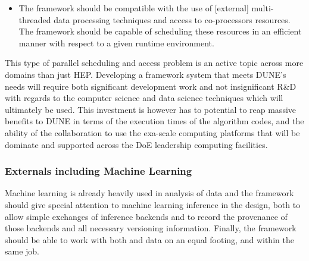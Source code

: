 \documentclass[../main-v1.tex]{subfiles}
\begin{document}
\begin{itemize}
\item The framework should be compatible with the use of [external] multi-threaded data processing techniques and access to co-processors resources.  The framework should be capable of scheduling these resources in an efficient manner with respect to a given runtime environment. 
\end{itemize}

This type of parallel scheduling and access problem is an active topic across more domains than just HEP.  Developing a framework system that meets DUNE's needs will require both significant development work and not insignificant R\&D with regards to the computer science and data science techniques which will ultimately be used.  This investment is however has to potential to reap massive benefits to DUNE in terms of the execution times of the algorithm codes, and the ability of the collaboration to use the exa-scale computing platforms that will be dominate and supported across the DoE leadership computing facilities.




\subsubsection{Externals including Machine Learning}
Machine learning is already heavily used in analysis of  data and the framework should give special attention to machine learning inference in the design, both to allow simple exchanges of inference backends and to record the provenance of those backends and all necessary versioning information.  Finally, the framework should be able to work with both  and  data on an equal footing, and within the same job.
\end{document}
